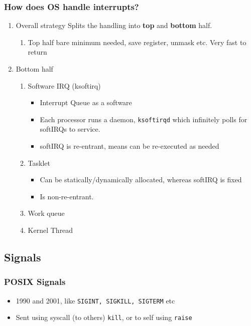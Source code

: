 \documentclass[11pt]{article}
\begin{document}
\subsubsection{How does OS handle interrupts?}
\label{sec:orgcfaa57a}
\begin{enumerate}
\item Overall strategy
\label{sec:orgb026f7a}
Splits the handling into \textbf{top} and \textbf{bottom} half.
\begin{enumerate}
\item Top half
\label{sec:org4a317d4}
bare minimum needed, save register, unmask etc. Very fast to return
\end{enumerate}
\item Bottom half
\label{sec:orgeef5d03}
\begin{enumerate}
\item Software IRQ (ksoftirq)
\label{sec:orga5fb464}
\begin{itemize}
\item Interrupt Queue as a software
\item Each processor runs a daemon, \texttt{ksoftirqd} which infinitely polls for softIRQs
to service.
\item softIRQ is re-entrant, means can be re-executed as needed
\end{itemize}
\item Tasklet
\label{sec:orgaa36fa9}
\begin{itemize}
\item Can be statically/dynamically allocated, whereas softIRQ is fixed
\item Is non-re-entrant.
\end{itemize}
\item Work queue
\label{sec:org40f3a7a}
\item Kernel Thread
\label{sec:org7094734}
\end{enumerate}
\end{enumerate}
\subsection{Signals}
\label{sec:org7105543}
\subsubsection{POSIX Signals}
\label{sec:org78686e9}
\begin{itemize}
\item 1990 and 2001, like \texttt{SIGINT, SIGKILL, SIGTERM} etc
\item Sent using syscall (to others) \texttt{kill}, or to self using \texttt{raise}
\end{itemize}
\end{document}
